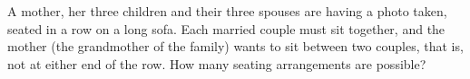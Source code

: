 A mother, her three children and their three spouses are having a photo taken, seated in a row on a long sofa. Each married couple must sit together, and the mother (the grandmother of the family) wants to sit between two couples, that is, not at either end of the row. How many seating arrangements are possible?
